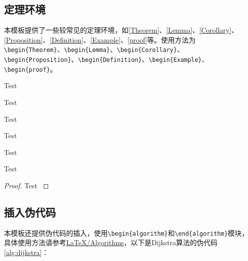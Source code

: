 \documentclass[12pt,hyperref,a4paper,UTF8]{ctexart}
\begin{document}
\subsection{定理环境}

本模板提供了一些较常见的定理环境，如\autoref{Theorem}、\autoref{Lemma}、\autoref{Corollary}、\autoref{Proposition}、\autoref{Definition}、\autoref{Example}、\autoref{proof}等。使用方法为\verb|\begin{Theorem}|、\verb|\begin{Lemma}|、\verb|\begin{Corollary}|、\verb|\begin{Proposition}|、\verb|\begin{Definition}|、\verb|\begin{Example}|、\verb|\begin{proof}|。

\begin{Theorem}
    Test
    \label{Theorem}
\end{Theorem}

\begin{Lemma}
    Test
    \label{Lemma}
\end{Lemma}

\begin{Corollary}
    Test
    \label{Corollary}
\end{Corollary}

\begin{Proposition}
    Test
    \label{Proposition}
\end{Proposition}

\begin{Definition}
    Test
    \label{Definition}
\end{Definition}

\begin{Example}
    Test
    \label{Example}
\end{Example}

\begin{proof}
    Test
    \label{proof}
\end{proof}

\subsection{插入伪代码}

本模板还提供伪代码的插入，使用\verb|\begin{algorithm}|和\verb|\end{algorithm}|模块，具体使用方法请参考\href{https://en.wikibooks.org/wiki/LaTeX/Algorithms}{LaTeX/Algorithms}，以下是Dijkstra算法的伪代码\ref{alg:dijkstra}：
\end{document}
